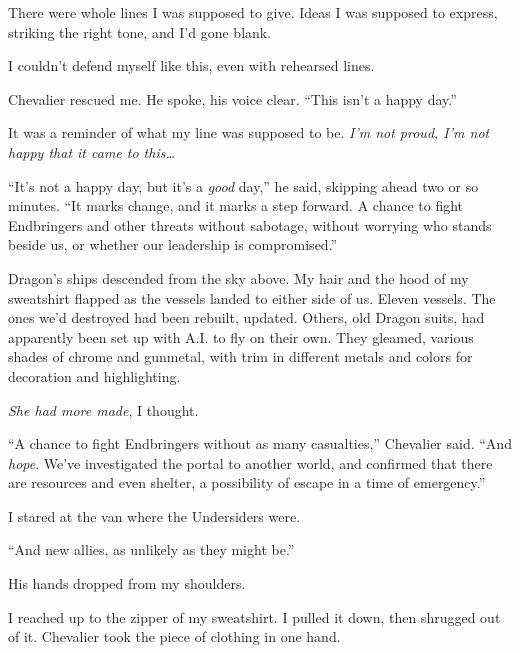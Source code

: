 There were whole lines I was supposed to give.  Ideas I was supposed to express, striking the right tone, and I'd gone blank.



I couldn't defend myself like this, even with rehearsed lines.



Chevalier rescued me.  He spoke, his voice clear.  ``This isn't a happy day.''



It was a reminder of what my line was supposed to be.  \emph{I'm not proud, I'm not happy that it came to this\ldots}



``It's not a happy day, but it's a \emph{good} day,'' he said, skipping ahead two or so minutes.  ``It marks change, and it marks a step forward.  A chance to fight Endbringers and other threats without sabotage, without worrying who stands beside us, or whether our leadership is compromised.''



Dragon's ships descended from the sky above.  My hair and the hood of my sweatshirt flapped as the vessels landed to either side of us.  Eleven vessels.  The ones we'd destroyed had been rebuilt, updated.  Others, old Dragon suits, had apparently been set up with A.I. to fly on their own.  They gleamed, various shades of chrome and gunmetal, with trim in different metals and colors for decoration and highlighting.



\emph{She had more made}, I thought.



``A chance to fight Endbringers without as many casualties,'' Chevalier said.  ``And \emph{hope}.  We've investigated the portal to another world, and confirmed that there are resources and even shelter, a possibility of escape in a time of emergency.''



I stared at the van where the Undersiders were.



``And new allies, as unlikely as they might be.''



His hands dropped from my shoulders.



I reached up to the zipper of my sweatshirt.  I pulled it down, then shrugged out of it.  Chevalier took the piece of clothing in one hand.



